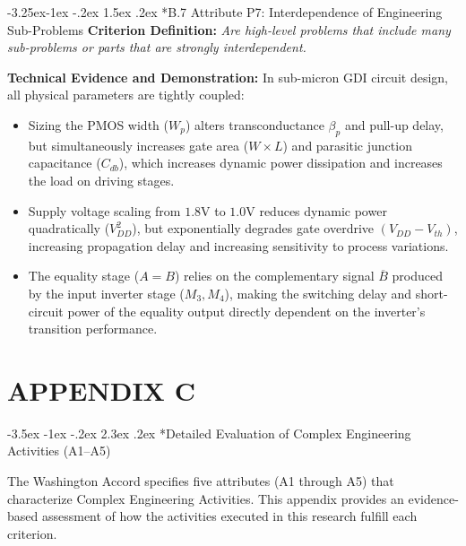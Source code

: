 \documentclass[12pt,a4paper,oneside]{report}
\makeatletter
\renewcommand\section{\@startsection {section}{1}{\z@}%
                                   {-3.5ex \@plus -1ex \@minus -.2ex}%
                                   {2.3ex \@plus.2ex}%
                                   {\normalfont\normalsize\bfseries}}
\renewcommand\subsection{\@startsection{subsection}{2}{\z@}%
                                     {-3.25ex\@plus -1ex \@minus -.2ex}%
                                     {1.5ex \@plus .2ex}%
                                     {\normalfont\normalsize\bfseries\itshape}}
\makeatother
\begin{document}
\subsection*{B.7 Attribute P7: Interdependence of Engineering Sub-Problems}
\textbf{Criterion Definition:} \textit{Are high-level problems that include many sub-problems or parts that are strongly interdependent.}

\noindent\textbf{Technical Evidence and Demonstration:}
In sub-micron GDI circuit design, all physical parameters are tightly coupled:
\begin{itemize}
\item Sizing the PMOS width ($W_p$) alters transconductance $\beta_p$ and pull-up delay, but simultaneously increases gate area ($W \times L$) and parasitic junction capacitance ($C_{db}$), which increases dynamic power dissipation and increases the load on driving stages.
\item Supply voltage scaling from $1.8\text{V}$ to $1.0\text{V}$ reduces dynamic power quadratically ($V_{DD}^2$), but exponentially degrades gate overdrive $(V_{DD} - V_{th})$, increasing propagation delay and increasing sensitivity to process variations.
\item The equality stage ($A=B$) relies on the complementary signal $\overline{B}$ produced by the input inverter stage ($M_3, M_4$), making the switching delay and short-circuit power of the equality output directly dependent on the inverter's transition performance.
\end{itemize}


\clearpage
\chapter*{APPENDIX C}

\section*{Detailed Evaluation of Complex Engineering Activities (A1--A5)}

The Washington Accord specifies five attributes (A1 through A5) that characterize Complex Engineering Activities. This appendix provides an evidence-based assessment of how the activities executed in this research fulfill each criterion.
\end{document}
